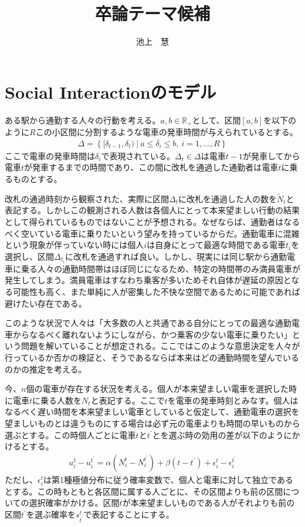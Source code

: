 \documentclass{jsarticle}
\begin{document}
\title{卒論テーマ候補 }
\author{池上　慧}
\maketitle

\section{Social Interactionのモデル}
ある駅から通勤する人々の行動を考える。$a,b\in \mathbb{R}_{+}$として、区間$[a, b]$を以下のように$R$この小区間に分割するような電車の発車時間が与えられているとする。
\begin{align*}
	\Delta = \left\{ [\delta_{t-1}, \delta_t)\ |\ a \leq \delta_i \leq b,\ i = 1, \dots, R \right\}
\end{align*}
ここで電車の発車時間は$\delta_i$で表現されている。$\Delta_t \in \Delta$は電車$t-1$が発車してから電車$t$が発車するまでの時間であり、この間に改札を通過した通勤者は電車$t$に乗るものとする。

改札の通過時刻から観察された、実際に区間$\Delta_t$に改札を通過した人の数を$\tilde{N}_t$と表記する。しかしこの観測される人数は各個人にとって本来望ましい行動の結果として得られているものではないことが予想される。なぜならば、通勤者はなるべく空いている電車に乗りたいという望みを持っているからだ。通勤電車に混雑という現象が伴っていない時には個人$i$は自身にとって最適な時間である電車$t_i$を選択し、区間$\Delta_{t_i}$に改札を通過すれば良い。しかし、現実には同じ駅から通勤電車に乗る人々の通勤時間帯はほぼ同じになるため、特定の時間帯のみ満員電車が発生してしまう。満員電車はすなわち乗客が多いためそれ自体が遅延の原因となる可能性も高く、また単純に人が密集した不快な空間であるために可能であれば避けたい存在である。

このような状況で人々は「大多数の人と共通である自分にとっての最適な通勤電車からなるべく離れないようにしながら、かつ乗客の少ない電車に乗りたい」という問題を解いていることが想定される。ここではこのような意思決定を人々が行っているか否かの検証と、そうであるならば本来はどの通勤時間を望んでいるのかの推定を考える。

今、$n$個の電車が存在する状況を考える。個人が本来望ましい電車を選択した時に電車$t$に乗る人数を$N_t$と表記する。ここで$t$を電車の発車時刻とみなす。個人はなるべく遅い時間を本来望ましい電車としていると仮定して、通勤電車の選択を望ましいものとは違うものにする場合は必ず元の電車よりも時間の早いものから選ぶとする。この時個人ごとに電車$t$と$t^{'}$とを選ぶ時の効用の差が以下のようにかけるとする。
\begin{align*}
	u_i^t - u_i^{t^{'}} = \alpha(N_i^t - N_i^{t^{'}}) + \beta(t - t^{'}) + \epsilon_i^t - \epsilon_i^{t^{'}}
\end{align*}
ただし、$\epsilon_i^t$は第1種極値分布に従う確率変数で、個人と電車に対して独立であるとする。この時もともと各区間に属する人ごとに、その区間よりも前の区間についての選択確率がかける。区間$t$が本来望ましいものである人がそれよりも前の区間$t^{'}$を選ぶ確率を$s_{t^{'}}^t$で表記することにする。
\end{document}
